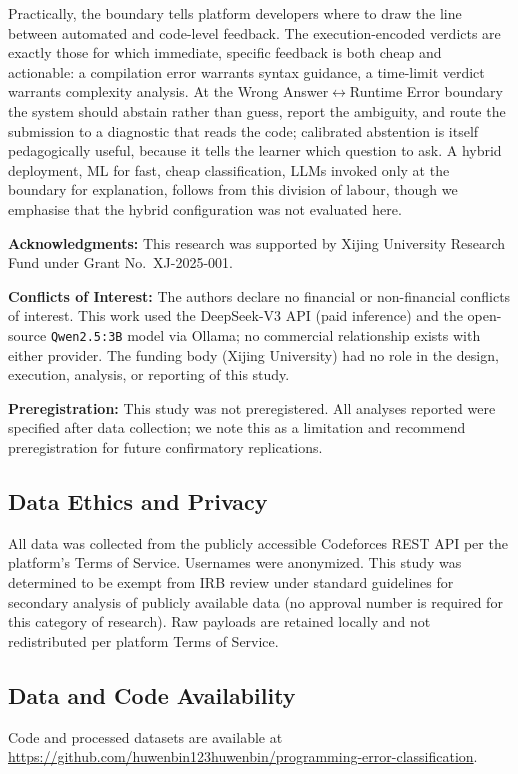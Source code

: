 \documentclass[acmsmall]{acmart}
\begin{document}
Practically, the boundary tells platform developers where to draw the line
between automated and code-level feedback. The execution-encoded verdicts are
exactly those for which immediate, specific feedback is both cheap and
actionable: a compilation error warrants syntax guidance, a time-limit verdict
warrants complexity analysis. At the Wrong Answer$\leftrightarrow$Runtime Error
boundary the system should abstain rather than guess, report the ambiguity, and
route the submission to a diagnostic that reads the code; calibrated abstention
is itself pedagogically useful, because it tells the learner which question to
ask. A hybrid deployment, ML for fast, cheap classification, LLMs invoked only
at the boundary for explanation, follows from this division of labour, though
we emphasise that the hybrid configuration was not evaluated here.

\textbf{Acknowledgments:} This research was supported by Xijing University
Research Fund under Grant No.~XJ-2025-001.

\textbf{Conflicts of Interest:} The authors declare no financial or non-financial
conflicts of interest. This work used the DeepSeek-V3 API (paid inference) and
the open-source \texttt{Qwen2.5:3B} model via Ollama; no commercial relationship
exists with either provider. The funding body (Xijing University) had no role in
the design, execution, analysis, or reporting of this study.

\textbf{Preregistration:} This study was not preregistered. All analyses reported
were specified after data collection; we note this as a limitation and recommend
preregistration for future confirmatory replications.

\subsection*{Data Ethics and Privacy}\label{sec:ethics}
All data was collected from the publicly accessible Codeforces REST API per
the platform's Terms of Service. Usernames were anonymized. This study was
determined to be exempt from IRB review under standard guidelines for
secondary analysis of publicly available data (no approval number is required
for this category of research). Raw payloads are retained locally and not
redistributed per platform Terms of Service.

\subsection*{Data and Code Availability}
\begin{sloppypar}\raggedright
Code and processed datasets are available at
\url{https://github.com/huwenbin123huwenbin/programming-error-classification}.
\end{sloppypar}



\end{document}
